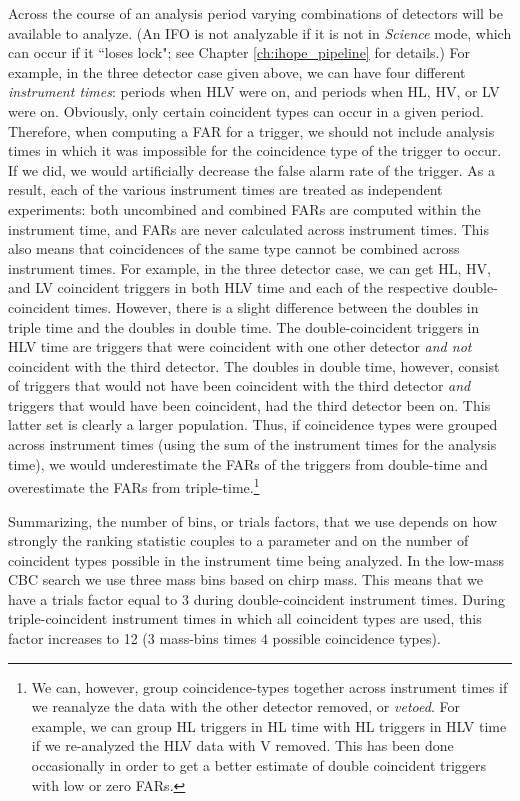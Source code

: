 Across the course of an analysis period varying combinations of detectors will be available to analyze. (An \ac{IFO} is not analyzable if it is not in \emph{Science} mode, which can occur if it ``loses lock"; see Chapter \ref{ch:ihope_pipeline} for details.) For example, in the three detector case given above, we can have four different \emph{instrument times}: periods when HLV were on, and periods when HL, HV, or LV were on. Obviously, only certain coincident types can occur in a given period. Therefore, when computing a \ac{FAR} for a trigger, we should not include analysis times in which it was impossible for the coincidence type of the trigger to occur. If we did, we would artificially decrease the false alarm rate of the trigger. As a result, each of the various instrument times are treated as independent experiments: both uncombined and combined \acp{FAR} are computed within the instrument time, and \acp{FAR} are never calculated across instrument times. This also means that coincidences of the same type cannot be combined across instrument times. For example, in the three detector case, we can get HL, HV, and LV coincident triggers in both HLV time and each of the respective double-coincident times. However, there is a slight difference between the doubles in triple time and the doubles in double time. The double-coincident triggers in HLV time are triggers that were coincident with one other detector \emph{and not} coincident with the third detector. The doubles in double time, however, consist of triggers that would not have been coincident with the third detector \emph{and} triggers that would have been coincident, had the third detector been on. This latter set is clearly a larger population. Thus, if coincidence types were grouped across instrument times (using the sum of the instrument times for the analysis time), we would underestimate the \acp{FAR} of the triggers from double-time and overestimate the \acp{FAR} from triple-time.\footnote{We can, however, group coincidence-types together across instrument times if we reanalyze the data with the other detector removed, or \emph{vetoed}. For example, we can group HL triggers in HL time with HL triggers in HLV time if we re-analyzed the HLV data with V removed. This has been done occasionally in order to get a better estimate of double coincident triggers with low or zero \acp{FAR}.} 

Summarizing, the number of bins, or trials factors, that we use depends on how strongly the ranking statistic couples to a parameter and on the number of coincident types possible in the instrument time being analyzed. In the low-mass \ac{CBC} search we use three mass bins based on chirp mass. This means that we have a trials factor equal to $3$ during double-coincident instrument times. During triple-coincident instrument times in which all coincident types are used, this factor increases to 12 ($3$ mass-bins times $4$ possible coincidence types).

